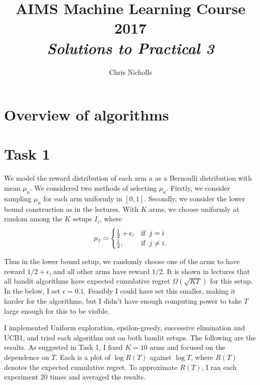 \documentclass[10pt]{article}
\title{AIMS Machine Learning Course 2017 \\ \emph{Solutions to Practical 3}}
\author{Chris Nicholls}
\begin{document}
\maketitle

\section{Overview of algorithms}

\section{Task 1}



We model the reward distribution of each arm $a$ as a Bernoulli distribution
with mean $\mu_a$. We considered two methods of selecting $\mu_a$. Firstly, we
consider sampling $\mu_a$ for each arm uniformly in $[0,1]$. Secondly, we
consider the lower bound construction as in the lectures. With $K$ arms, we
choose uniformly at random among the $K$ setups $I_i$, where
\begin{align*}
    \mu_j =
    \begin{cases}
        \frac{1}{2} + \epsilon, & \textrm{if} \hspace{0.2cm} j = i \\
        \frac{1}{2}, & \textrm{if} \hspace{0.2cm} j \not= i.
    \end{cases}
\end{align*}

Thus in the lower bound setup, we randomly choose one of the arms to have reward
$1/2 + \epsilon$, and all other arms have reward $1/2$. It is shown in lectures
that all bandit algorithms have expected cumulative regret $\Omega(\sqrt{K T})$
for this setup. In the below, I set $\epsilon = 0.1$. Feasibly I could have set
this smaller, making it harder for the algorithms, but I didn't have enough
computing power to take $T$ large enough for this to be visible.

I implemented Uniform exploration, epsilon-greedy, successive elimination and
UCB1, and tried each algorithm out on both bandit setups. The following are the
results. As suggested in Task 1, I fixed $K = 10$ arms and focused on the
dependence on $T$. Each is a plot of $\log R(T)$ against $\log T$, where $R(T)$
denotes the expected cumulative regret. To approximate $R(T)$, I ran each
experiment 20 times and averaged the results.
\end{document}
